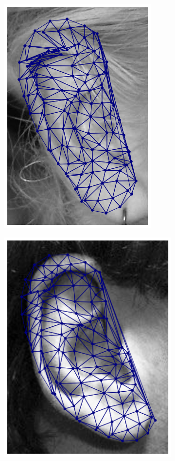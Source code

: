 \begin{figure}[!h]
\centering
    \begin{subfigure}[b]{0.7\textwidth}
            \includegraphics[height=1\textwidth]{supports/Fittings/fitting_ear_0000}
    \end{subfigure}
    \begin{subfigure}[b]{0.7\textwidth}
            \includegraphics[height=1\textwidth]{supports/Fittings/fitting_ear_0001}

\end{subfigure}
\end{figure}
